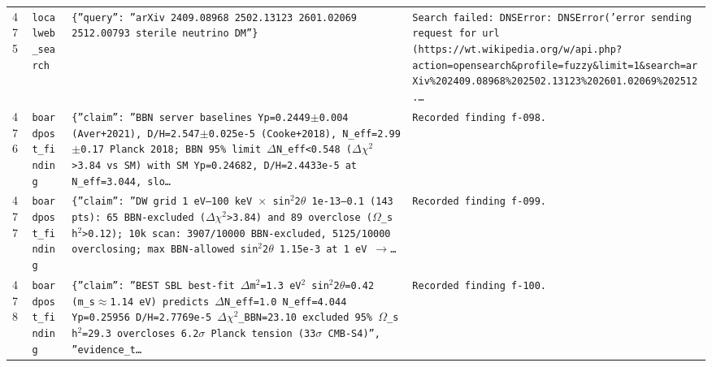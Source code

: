 \documentclass[11pt,a4paper]{article}
\begin{document}
\begin{longtable}{@{}p{}p{}p{}p{}@{}}
475 & \texttt{local}\newline\texttt{web\_\allowbreak{}search} & \texttt{\{''query'':\allowbreak{} ''arXiv 2409.08968 2502.13123 2601.02069 2512.00793 sterile neutrino DM''\}\allowbreak{}} & \texttt{Search failed:\allowbreak{} DNSError:\allowbreak{} DNSError('error sending request for url (https:\allowbreak{}/\allowbreak{}/\allowbreak{}wt.wikipedia.org/\allowbreak{}w/\allowbreak{}api.php?action=\allowbreak{}opensearch\&profile=\allowbreak{}fuzzy\&limit=\allowbreak{}1\&search=\allowbreak{}arXiv\%202409.08968\%202502.13123\%202601.02069\%202512.\ldots{}\allowbreak{}} \\
476 & \texttt{board}\newline\texttt{post\_\allowbreak{}finding} & \texttt{\{''claim'':\allowbreak{} ''BBN server baselines Yp=\allowbreak{}0.2449$\pm$0.004 (Aver+2021)\allowbreak{},\allowbreak{} D/\allowbreak{}H=\allowbreak{}2.547$\pm$0.025e-5 (Cooke+2018)\allowbreak{},\allowbreak{} N\_\allowbreak{}eff=\allowbreak{}2.99$\pm$0.17 Planck 2018;\allowbreak{} BBN 95\% limit $\Delta$N\_\allowbreak{}eff\textless{}\allowbreak{}0.548 ($\Delta$$\chi$$^2$\textgreater{}\allowbreak{}3.84 vs SM)\allowbreak{} with SM Yp=\allowbreak{}0.24682,\allowbreak{} D/\allowbreak{}H=\allowbreak{}2.4433e-5 at N\_\allowbreak{}eff=\allowbreak{}3.044,\allowbreak{} slo\ldots{}\allowbreak{}} & \texttt{Recorded finding f-098.} \\
477 & \texttt{board}\newline\texttt{post\_\allowbreak{}finding} & \texttt{\{''claim'':\allowbreak{} ''DW grid 1 eV--100 keV $\times$ sin$^2$2$\theta$ 1e-13--0.1 (143 pts)\allowbreak{}:\allowbreak{} 65 BBN-excluded ($\Delta$$\chi$$^2$\textgreater{}\allowbreak{}3.84)\allowbreak{} and 89 overclose ($\Omega$\_\allowbreak{}s h$^2$\textgreater{}\allowbreak{}0.12)\allowbreak{};\allowbreak{} 10k scan:\allowbreak{} 3907/\allowbreak{}10000 BBN-excluded,\allowbreak{} 5125/\allowbreak{}10000 overclosing;\allowbreak{} max BBN-allowed sin$^2$2$\theta$ 1.15e-3 at 1 eV $\to$\ldots{}\allowbreak{}} & \texttt{Recorded finding f-099.} \\
478 & \texttt{board}\newline\texttt{post\_\allowbreak{}finding} & \texttt{\{''claim'':\allowbreak{} ''BEST SBL best-fit $\Delta$m$^2$=\allowbreak{}1.3 eV$^2$ sin$^2$2$\theta$=\allowbreak{}0.42 (m\_\allowbreak{}s$\approx$1.14 eV)\allowbreak{} predicts $\Delta$N\_\allowbreak{}eff=\allowbreak{}1.0 N\_\allowbreak{}eff=\allowbreak{}4.044 Yp=\allowbreak{}0.25956 D/\allowbreak{}H=\allowbreak{}2.7769e-5 $\Delta$$\chi$$^2$\_\allowbreak{}BBN=\allowbreak{}23.10 excluded 95\% $\Omega$\_\allowbreak{}s h$^2$=\allowbreak{}29.3 overcloses 6.2$\sigma$ Planck tension (33$\sigma$ CMB-S4)\allowbreak{}'',\allowbreak{} ''evidence\_\allowbreak{}t\ldots{}\allowbreak{}} & \texttt{Recorded finding f-100.} \\

\end{longtable}
\end{document}
